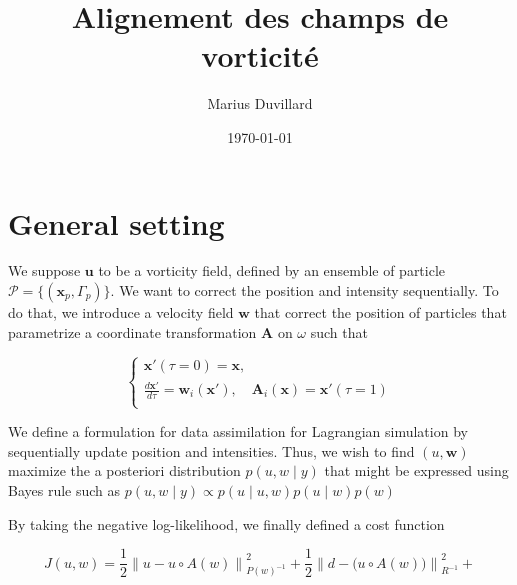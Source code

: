 \documentclass{article}
\title{Alignement des champs de vorticité}
\author{Marius Duvillard}
\date{\today}
\newcommand{\norm}[1]{\left\lVert #1 \right\rVert}
\begin{document}
\maketitle

\section{General setting}

We suppose $\bm u$ to be a vorticity field, defined by an ensemble of particle $\mathcal P = \{(\bm x_p, \Gamma_p)\}$. We want to correct the position and intensity sequentially. To do that, we introduce a velocity field $\bm w$ that correct the position of particles that parametrize a coordinate transformation $\bm A$ on $\omega$ such that

\begin{equation*}
    \begin{cases}
        \bm x'(\tau = 0) = \bm x,                                                           \\
        \frac{d \bm x'}{d \tau} = \bm w_i (\bm x'), \quad \bm A_i(\bm x) = \bm x'(\tau = 1) \\
    \end{cases}
\end{equation*}

We define a formulation for data assimilation for Lagrangian simulation by sequentially update position and intensities. Thus, we wish to find $(u, \bm w)$maximize the a posteriori distribution $p(u, w \mid y)$ that might be expressed using Bayes rule such as $p(u, w \mid y) \propto p(u \mid u, w)p(u\mid w) p(w)$

By taking the negative log-likelihood, we finally defined a cost function

\begin{equation*}
    J(u, w) = \frac12 \norm{u - u \circ A(w)}_{P(w)^{-1}}^2 + \frac12 \norm{d - \mathcal(u\circ A(w))}^2_{R^{-1}} +
\end{equation*}
\end{document}
